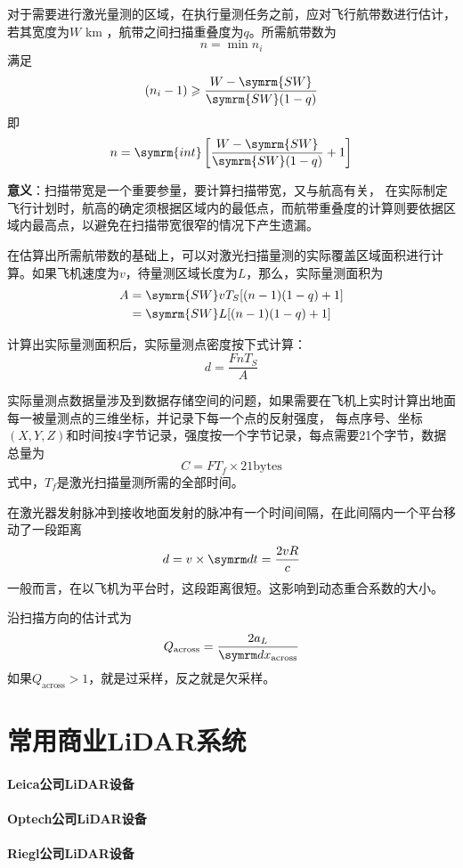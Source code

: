 对于需要进行激光量测的区域，在执行量测任务之前，应对飞行航带数进行估计，若其宽度为$ W $ km ，航带之间扫描重叠度为$ q $。所需航带数为
\begin{equation}
n = \min n_i
\end{equation}
满足
\begin{equation}
(n_i - 1) \geqslant \dfrac{W - \symrm{SW}}{\symrm{SW}(1-q)}
\end{equation}
即
\begin{equation}
n = \symrm{int} \left[ \dfrac{W - \symrm{SW}}{\symrm{SW}(1-q)} + 1\right]
\end{equation}

\textbf{意义}：扫描带宽是一个重要参量，要计算扫描带宽，又与航高有关，
在实际制定飞行计划时，航高的确定须根据区域内的最低点，而航带重叠度的计算则要依据区域内最高点，以避免在扫描带宽很窄的情况下产生遗漏。

在估算出所需航带数的基础上，可以对激光扫描量测的实际覆盖区域面积进行计算。如果飞机速度为$ v $，待量测区域长度为$ L $，那么，实际量测面积为
\begin{align}
\begin{split}
A & = \symrm{SW} v T_S [(n - 1)(1 - q) + 1] \\
& = \symrm{SW} L [(n - 1)(1 - q) + 1]
\end{split}
\end{align}

计算出实际量测面积后，实际量测点密度按下式计算：
\begin{equation}
d = \dfrac{FnT_S}{A}
\end{equation}

实际量测点数据量涉及到数据存储空间的问题，如果需要在飞机上实时计算出地面每一被量测点的三维坐标，并记录下每一个点的反射强度，
每点序号、坐标$ (X,Y,Z) $和时间按4字节记录，强度按一个字节记录，每点需要21个字节，数据总量为
\begin{equation}
C = FT_f \times 21 \text{bytes}
\end{equation}
式中，$ T_f $是激光扫描量测所需的全部时间。

在激光器发射脉冲到接收地面发射的脉冲有一个时间间隔，在此间隔内一个平台移动了一段距离
\begin{equation}
d = v \times \diff t = \dfrac{2vR}{c}
\end{equation}
一般而言，在以飞机为平台时，这段距离很短。这影响到动态重合系数的大小。

沿扫描方向的估计式为
\begin{equation}
Q_{\text{across}} = \dfrac{2a_L}{\diff x_{\text{across}}}
\end{equation}
如果$ Q_{\text{across}} > 1$，就是过采样，反之就是欠采样。

\section{常用商业LiDAR系统}
\paragraph{Leica公司LiDAR设备}
\paragraph{Optech公司LiDAR设备}
\paragraph{Riegl公司LiDAR设备}